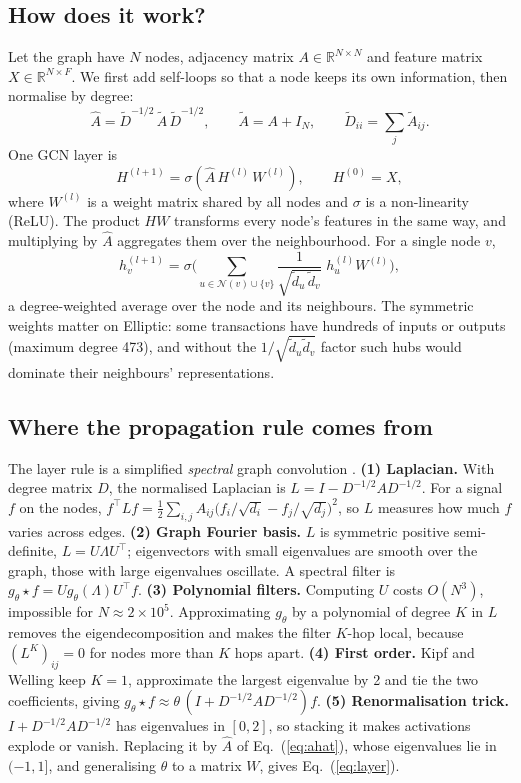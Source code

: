 \documentclass[11pt,a4paper]{article}
\newcommand{\Ahat}{\hat{A}}
\begin{document}
\subsection{How does it work?}
Let the graph have $N$ nodes, adjacency matrix $A\in\mathbb{R}^{N\times N}$ and feature matrix $X\in\mathbb{R}^{N\times F}$.
We first add self-loops so that a node keeps its own information, then normalise by degree:
\begin{equation}
  \Ahat = \tilde D^{-1/2}\,\tilde A\,\tilde D^{-1/2},\qquad \tilde A = A + I_N,\qquad \tilde D_{ii} = \sum_j \tilde A_{ij}.
  \label{eq:ahat}
\end{equation}
One GCN layer is
\begin{equation}
  H^{(l+1)} = \sigma\!\left(\Ahat\,H^{(l)}\,W^{(l)}\right),\qquad H^{(0)} = X,
  \label{eq:layer}
\end{equation}
where $W^{(l)}$ is a weight matrix shared by all nodes and $\sigma$ is a non-linearity (ReLU). The product $H W$ transforms every
node's features in the same way, and multiplying by $\Ahat$ aggregates them over the neighbourhood. For a single node $v$,
\begin{equation}
  h_v^{(l+1)} = \sigma\Big(\sum_{u\in\mathcal N(v)\cup\{v\}} \frac{1}{\sqrt{\tilde d_u\,\tilde d_v}}\; h_u^{(l)}W^{(l)}\Big),
  \label{eq:node}
\end{equation}
a degree-weighted average over the node and its neighbours. The symmetric weights matter on Elliptic: some transactions
have hundreds of inputs or outputs (maximum degree 473), and without the $1/\sqrt{\tilde d_u \tilde d_v}$ factor
such hubs would dominate their neighbours' representations.

\subsection{Where the propagation rule comes from}
The layer rule is a simplified \emph{spectral} graph convolution \cite{kipf}.
\textbf{(1) Laplacian.} With degree matrix $D$, the normalised Laplacian is $L = I - D^{-1/2} A D^{-1/2}$. For a signal $f$ on the
nodes, $f^\top L f = \tfrac12\sum_{i,j} A_{ij}\big(f_i/\sqrt{d_i} - f_j/\sqrt{d_j}\big)^2$, so $L$ measures how much $f$ varies
across edges. \textbf{(2) Graph Fourier basis.} $L$ is symmetric positive semi-definite, $L = U\Lambda U^\top$; eigenvectors with small
eigenvalues are smooth over the graph, those with large eigenvalues oscillate. A spectral filter is
$g_\theta \star f = U g_\theta(\Lambda) U^\top f$. \textbf{(3) Polynomial filters.} Computing $U$ costs $O(N^3)$, impossible for
$N\approx 2\times10^5$. Approximating $g_\theta$ by a polynomial of degree $K$ in $L$ removes the eigendecomposition and makes the filter
$K$-hop local, because $(L^K)_{ij}=0$ for nodes more than $K$ hops apart. \textbf{(4) First order.} Kipf and Welling keep $K=1$,
approximate the largest eigenvalue by 2 and tie the two coefficients, giving $g_\theta\star f \approx \theta\,(I + D^{-1/2}AD^{-1/2})f$.
\textbf{(5) Renormalisation trick.} $I + D^{-1/2}AD^{-1/2}$ has eigenvalues in $[0,2]$, so stacking it makes activations explode or
vanish. Replacing it by $\Ahat$ of Eq.~(\ref{eq:ahat}), whose eigenvalues lie in $(-1,1]$, and generalising $\theta$ to a
matrix $W$, gives Eq.~(\ref{eq:layer}).
\end{document}
